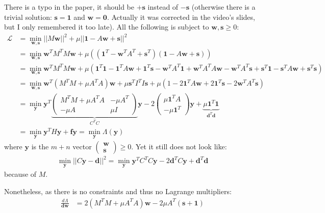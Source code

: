 \documentclass[a4paper,final,11pt]{article}
\newcommand{\bm}[1]{\boldsymbol{#1}}
\begin{document}
There is a typo in the paper, it should be $+\bm{s}$ instead of $-\bm{s}$
(otherwise there is a trivial solution: $\bm{s} = \bm{1}$ and $\bm{w} =
\bm{0}$. Actually it was corrected in the video's slides, but I only
remembered it too late).
	All the following is subject to $\bm{w},\bm{s}\geq0$:
\begin{align*}
\mathcal{L} &= \min_{\bm{w},\bm{s}} ||M\bm{w}||^2 + \mu||\mathbf{\bm{1}} - A\bm{w} + \bm{s}||^2 \\
	    &= \min_{\bm{w},\bm{s}} \bm{w}^TM^TM\bm{w} + \mu\left( (\bm{1}^T -\bm{w}^TA^T +\bm{s}^T)(\bm{1} - A\bm{w} + \bm{s})\right)\\
	    &= \min_{\bm{w},\bm{s}} \bm{w}^TM^TM\bm{w} + \mu\left( \bm{1}^T\bm{1} - \bm{1}^TA\bm{w} + \bm{1}^T\bm{s} -\bm{w}^TA^T\bm{1} +\bm{w}^TA^TA\bm{w} -\bm{w}^TA^T\bm{s}+\bm{s}^T\bm{1} -\bm{s}^T A\bm{w} +\bm{s}^T \bm{s}\right)\\
	    &= \min_{\bm{w},\bm{s}} \bm{w}^T(M^TM+\mu A^TA)\bm{w} +\mu \bm{s}^TI^TI\bm{s} +
	    \mu\left( 1 - 2 \bm{1}^TA\bm{w} + 2 \bm{1}^T\bm{s} -2\bm{w}^TA^T\bm{s}\right)\\
	    &= \min_{\bm{y}} \bm{y}^T
\underbrace{\begin{pmatrix}
M^TM+\mu A^TA & -\mu A^T \\
-\mu A & \mu I
\end{pmatrix}}_{C^TC}\bm{y} -2\begin{pmatrix}
\mu \bm{1}^TA \\
-\mu \bm{1}^T
\end{pmatrix}\bm{y}
+\underbrace{\mu\bm{1}^T\bm{1}}_{\bm{d}^T\bm{d}}\\
&= \min_{\bm{y}} \bm{y}^T H \bm{y} + \bm{f}\bm{y} = \min_{\bm{y}} \Lambda(\bm{y})
\end{align*}
where $\bm{y}$ is the $m+n$ vector 
$
\begin{pmatrix}
	\bm{w}\\
	\bm{s}
\end{pmatrix}\geq0$. Yet it still does not look like:
\begin{align*}
\min_{\bm{y}} ||C\bm{y} - \bm{d} ||^2 = \min_{\bm{y}} \bm{y}^TC^TC\bm{y} - 2\bm{d}^TC\bm{y} + \bm{d}^T\bm{d}
\end{align*}
because of $M$.

Nonetheless, as there is no constraints and thus no Lagrange multipliers:
\begin{align*}
	\frac{d\Lambda}{\bm{dw}} &= 2(M^TM+\mu A^TA)\bm{w} - 2\mu A^T(\bm{s} + \bm{1})
\end{align*}

\begin{center}





\end{center}
\end{document}
